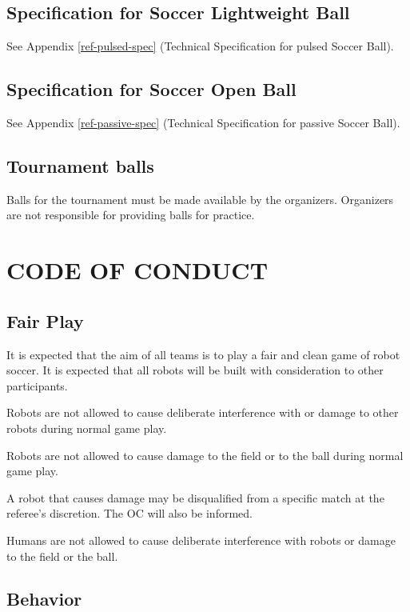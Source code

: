 \documentclass{article}
\begin{document}
\subsection{Specification for Soccer Lightweight Ball \label{ref-sec-spec-plused}}

See Appendix \ref{ref-pulsed-spec} (Technical Specification for pulsed Soccer
Ball).

\subsection{Specification for Soccer Open Ball\label{ref-sec-spec-open}}

See Appendix \ref{ref-passive-spec} (Technical Specification for passive Soccer
Ball).

\subsection{ Tournament balls \label{ref-tournament-balls}}

Balls for the tournament must be made available by the organizers. Organizers
are not responsible for providing balls for practice.

\section{CODE OF CONDUCT\label{ref-code-of-conduct}}

\subsection{ Fair Play \label{ref-041}}

It is expected that the aim of all teams is to play a fair and clean game of
robot soccer. It is expected that all robots will be built with consideration
to other participants.

Robots are not allowed to cause deliberate interference with or damage to other
robots during normal game play.

Robots are not allowed to cause damage to the field or to the ball during
normal game play.

A robot that causes damage may be disqualified from a specific
match at the referee's discretion. The OC will also be informed.

Humans are not allowed to cause deliberate interference with robots or damage
to the field or the ball.

\subsection{ Behavior \label{ref-042}}
\end{document}
